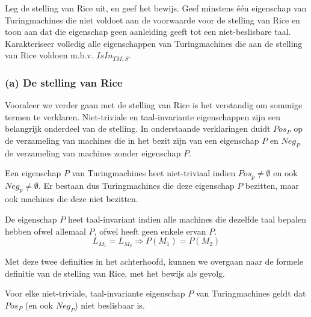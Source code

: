 \begin{question}
	Leg de stelling van Rice uit, en geef het bewijs. Geef minstens \'e\'en eigenschap van Turingmachines die niet voldoet aan de voorwaarde voor de stelling van Rice en toon aan dat die eigenschap geen aanleiding geeft tot een niet-beslisbare taal. Karakteriseer volledig alle eigenschappen van Turingmachines die aan de stelling van Rice voldoen m.b.v. $IsIn_{TM,S}$.
\end{question}

\subsubsection*{(a) De stelling van Rice}

Vooraleer we verder gaan met de stelling van Rice is het verstandig om sommige termen te verklaren. Niet-triviale en taal-invariante eigenschappen zijn een belangrijk onderdeel van de stelling. In onderstaande verklaringen duidt $Pos_P$ op de verzameling van machines die in het bezit zijn van een eigenschap $P$ en $Neg_P$ de verzameling van machines zonder eigenschap $P$.

\begin{theorem}
	Een eigenschap $P$ van Turingmachines heet niet-triviaal indien $Pos_p \neq \emptyset$ en ook $Neg_p \neq \emptyset$. Er bestaan dus Turingmachines die deze eigenschap $P$ bezitten, maar ook machines die deze niet bezitten.
\end{theorem}

\begin{theorem} 
	De eigenschap $P$ heet taal-invariant indien alle machines die dezelfde taal bepalen hebben ofwel allemaal $P$, ofwel heeft geen enkele ervan $P$.
	$$L_{M_1} = L_{M_2} \Rightarrow P(M_1) = P(M_2)$$
\end{theorem}

\noindent Met deze twee definities in het achterhoofd, kunnen we overgaan naar de formele definitie van de stelling van Rice, met het bewijs als gevolg.

\begin{theorem}
	Voor elke niet-triviale, taal-invariante eigenschap $P$ van Turingmachines geldt dat $Pos_P$ (en ook $Neg_P$) niet beslisbaar is.
\end{theorem}

